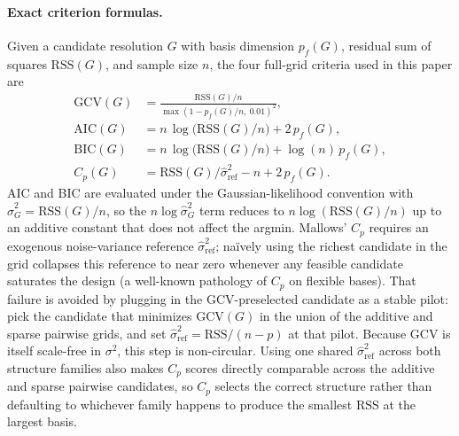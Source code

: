 \documentclass{article}
\begin{document}
\paragraph{Exact criterion formulas.}
Given a candidate resolution $G$ with basis dimension $p_f(G)$, residual sum of squares $\mathrm{RSS}(G)$, and sample size $n$, the four full-grid criteria used in this paper are
\begin{align*}
  \mathrm{GCV}(G) &= \frac{\mathrm{RSS}(G)/n}{\max(1 - p_f(G)/n,\ 0.01)^2}, \\
  \mathrm{AIC}(G) &= n\,\log\!\bigl(\mathrm{RSS}(G)/n\bigr) + 2\,p_f(G), \\
  \mathrm{BIC}(G) &= n\,\log\!\bigl(\mathrm{RSS}(G)/n\bigr) + \log(n)\,p_f(G), \\
  C_p(G) &= \mathrm{RSS}(G)/\widehat{\sigma}^{2}_{\mathrm{ref}} - n + 2\,p_f(G).
\end{align*}
AIC and BIC are evaluated under the Gaussian-likelihood convention with $\widehat\sigma^2_G = \mathrm{RSS}(G)/n$, so the $n\log\widehat\sigma^2_G$ term reduces to $n\log(\mathrm{RSS}(G)/n)$ up to an additive constant that does not affect the argmin. Mallows' $C_p$ requires an exogenous noise-variance reference $\widehat\sigma^2_{\mathrm{ref}}$; na\"ively using the richest candidate in the grid collapses this reference to near zero whenever any feasible candidate saturates the design (a well-known pathology of $C_p$ on flexible bases). That failure is avoided by plugging in the GCV-preselected candidate as a stable pilot: pick the candidate that minimizes $\mathrm{GCV}(G)$ in the union of the additive and sparse pairwise grids, and set $\widehat\sigma^2_{\mathrm{ref}} = \mathrm{RSS}/(n - p)$ at that pilot. Because GCV is itself scale-free in $\sigma^2$, this step is non-circular. Using one shared $\widehat\sigma^2_{\mathrm{ref}}$ across both structure families also makes $C_p$ scores directly comparable across the additive and sparse pairwise candidates, so $C_p$ selects the correct structure rather than defaulting to whichever family happens to produce the smallest $\mathrm{RSS}$ at the largest basis.
\end{document}
